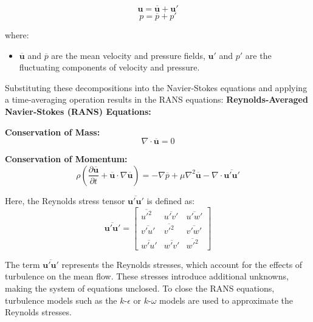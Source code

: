 \begin{equation}
\mathbf{u} = \overline{\mathbf{u}} + \mathbf{u}'
\end{equation}
\begin{equation}
p = \overline{p} + p'
\end{equation}

where:
\begin{itemize}
    \item $\overline{\mathbf{u}}$ and $\overline{p}$ are the mean velocity and pressure fields, $\mathbf{u}'$ and $p'$ are the fluctuating components of velocity and pressure.
\end{itemize}

Substituting these decompositions into the Navier-Stokes equations and applying a time-averaging operation results in the RANS equations:
\textbf{Reynolds-Averaged Navier-Stokes (RANS) Equations:}

\textbf{Conservation of Mass:}
\begin{equation}
\nabla \cdot \overline{\mathbf{u}} = 0
\end{equation}

\textbf{Conservation of Momentum:}
\begin{equation}
\rho \left( \frac{\partial \overline{\mathbf{u}}}{\partial t} + \overline{\mathbf{u}} \cdot \nabla \overline{\mathbf{u}} \right) = -\nabla \overline{p} + \mu \nabla^2 \overline{\mathbf{u}} - \nabla \cdot \overline{\mathbf{u}' \mathbf{u}'}
\end{equation}

Here, the Reynolds stress tensor $\overline{\mathbf{u}' \mathbf{u}'}$ is defined as:
\begin{equation}
\overline{\mathbf{u}' \mathbf{u}'} = 
\begin{bmatrix}
\overline{u'^2} & \overline{u'v'} & \overline{u'w'} \\
\overline{v'u'} & \overline{v'^2} & \overline{v'w'} \\
\overline{w'u'} & \overline{w'v'} & \overline{w'^2}
\end{bmatrix}
\end{equation}

The term $\overline{\mathbf{u}' \mathbf{u}'}$ represents the Reynolds stresses, 
which account for the effects of turbulence on the mean flow. 
These stresses introduce additional unknowns, making the system of equations unclosed. 
To close the RANS equations, turbulence models such as the $k$-$\epsilon$ or $k$-$\omega$ models are used to approximate the Reynolds stresses.

